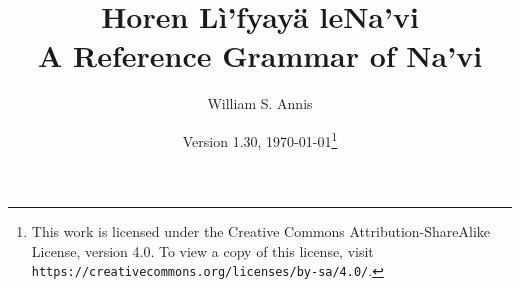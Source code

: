 \documentclass[12pt,oneside]{book}
\begin{document}
\frenchspacing

\title{Horen Lì'fyayä leNa'vi\\A Reference Grammar of Na'vi}
\author{William S. Annis}
\date{Version 1.30, \today\footnote{This work is licensed
    under the Creative Commons Attribution-ShareAlike License, version
    4.0.  To view a copy of this license, visit 
    \texttt{https://creativecommons.org/licenses/by-sa/4.0/}.}}
\maketitle

\setcounter{tocdepth}{2}
\begin{multicols}{2}
\tableofcontents
\end{multicols}










\appendix
{\small \printindex}


\end{document}
